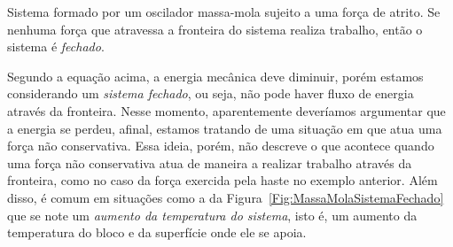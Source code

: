 \begin{marginfigure}
\centering
{}
\caption{Sistema formado por um oscilador massa-mola sujeito a uma força de atrito. Se nenhuma força que atravessa a fronteira do sistema realiza trabalho, então o sistema é \emph{fechado}.\label{Fig:MassaMolaSistemaFechado}}
\end{marginfigure}

Segundo a equação acima, a energia mecânica deve diminuir, porém estamos considerando um \emph{sistema fechado}, ou seja, não pode haver fluxo de energia através da fronteira. Nesse momento, aparentemente deveríamos argumentar que a energia se perdeu, afinal, estamos tratando de uma situação em que atua uma força não conservativa. Essa ideia, porém, não descreve o que acontece quando uma força não conservativa atua de maneira a realizar trabalho através da fronteira, como no caso da força exercida pela haste no exemplo anterior. Além disso, é comum em situações como a da Figura~\ref{Fig:MassaMolaSistemaFechado} que se note um \emph{aumento da temperatura do sistema}, isto é, um aumento da temperatura do bloco e da superfície onde ele se apoia.

